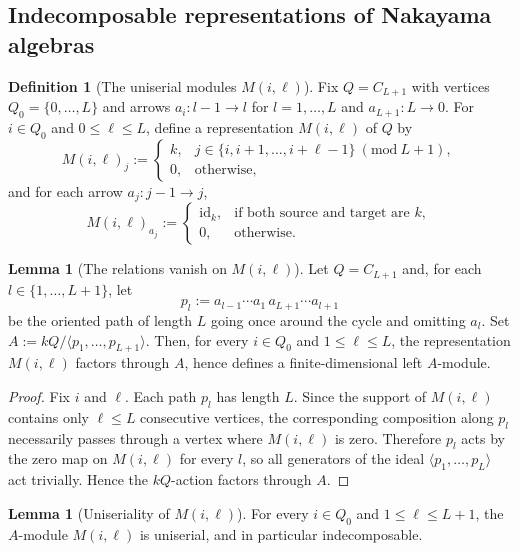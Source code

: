 \documentclass{article}
\theoremstyle{definition}
\newtheorem{lemma}[theorem]{Lemma}
\newtheorem{definition}[theorem]{Definition}
\begin{document}
\subsection{Indecomposable representations of Nakayama algebras}
\begin{definition}[The uniserial modules $M(i,\ell)$]
Fix $Q=C_{L+1}$ with vertices $Q_0=\{0,\dots,L\}$ and arrows $a_i:l-1\to l$ for $l=1,\dots,L$ and $a_{L+1}:L\to 0$.
For $i\in Q_0$ and $0\le \ell\le L$, define a representation $M(i,\ell)$ of $Q$ by
\[
M(i,\ell)_j :=
\begin{cases}
k, & j\in\{i,i+1,\dots,i+\ell-1\}\ (\mathrm{mod}\ L + 1),\\
0, & \text{otherwise},
\end{cases}
\]
and for each arrow $a_j:j-1\to j$,
\[
M(i,\ell)_{a_j} :=
\begin{cases}
\mathrm{id}_k, & \text{if both source and target are }k,\\
0, & \text{otherwise}.
\end{cases}
\]
\end{definition}

\begin{lemma}[The relations vanish on $M(i,\ell)$]\label{lem:Miell-well-defined}
Let $Q=C_{L+1}$ and, for each $l\in\{1,\dots,L+1\}$, let
\[
p_l := a_{l-1}\cdots a_1\, a_{L+1}\cdots a_{l+1}
\]
be the oriented path of length $L$ going once around the cycle and omitting $a_l$.
Set $A:=kQ/\langle p_1,\dots,p_{L+1}\rangle$.
Then, for every $i\in Q_0$ and $1\le \ell\le L$, the representation $M(i,\ell)$ factors through $A$, hence defines a finite-dimensional left $A$-module.
\end{lemma}

\begin{proof}
Fix $i$ and $\ell$. Each path $p_l$ has length $L$.
Since the support of $M(i,\ell)$ contains only $\ell\le L$ consecutive vertices, the corresponding composition along $p_l$ necessarily passes through a vertex where $M(i,\ell)$ is zero.
Therefore $p_l$ acts by the zero map on $M(i,\ell)$ for every $l$, so all generators of the ideal $\langle p_1,\dots,p_{L}\rangle$ act trivially.
Hence the $kQ$-action factors through $A$.
\end{proof}

\begin{lemma}[Uniseriality of $M(i,\ell)$]\label{lem:Miell-uniserial}
For every $i\in Q_0$ and $1\le \ell\le L + 1$, the $A$-module $M(i,\ell)$ is uniserial, and in particular indecomposable.
\end{lemma}
\end{document}
